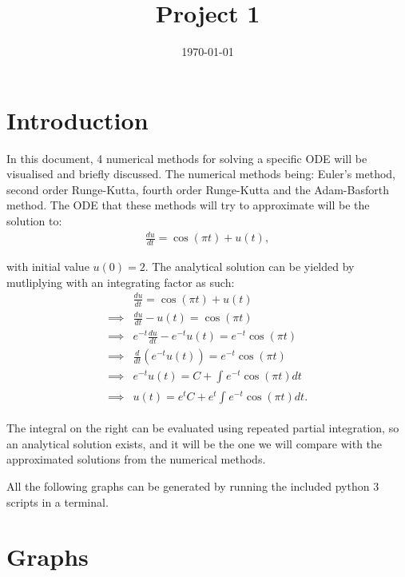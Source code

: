 \documentclass[10pt]{article}
\date{\today}
\title{Project 1}
\begin{document}
\maketitle

\section{Introduction}
\label{sec:orgb01bfc6}
In this document, 4 numerical methods for solving a specific ODE
will be visualised and briefly discussed. The numerical methods being:
Euler's method, second order Runge-Kutta, fourth order Runge-Kutta and the
Adam-Basforth method. The ODE that these methods will try to approximate will
be the solution to:
\begin{align*}
\frac{du}{dt} = \cos(\pi t) + u(t)
,
\end{align*}

with initial value \(u(0) = 2\). The analytical solution can
be yielded by mutliplying with an integrating factor as such:
\begin{align*}
 &  \frac{du}{dt} = \cos (\pi t) + u(t) \\
\implies & \frac{du}{dt} - u(t) = \cos(\pi t) \\
\implies & e^{-t} \frac{du}{dt} - e^{-t} u(t) = e^{-t} \cos(\pi t) \\
\implies & \frac{d}{dt} ( e^{-t} u (t)) = e^{-t} \cos( \pi t ) \\
\implies & e^{-t} u(t) = C + \int_{  } e^{-t} \cos (\pi t) dt \\
\implies & u(t) = e^{t} C + e^{t} \int_{  } e^{-t} \cos (\pi t) dt 
.
\end{align*}

The integral on the right can be evaluated using repeated partial integration,
so an analytical solution exists, and it will be the one we will compare with
the approximated solutions from the numerical methods.


All the following graphs can be generated by running the included python 3 scripts in a terminal.
\newpage
\section{Graphs}
\label{sec:orgfd98026}
\end{document}
